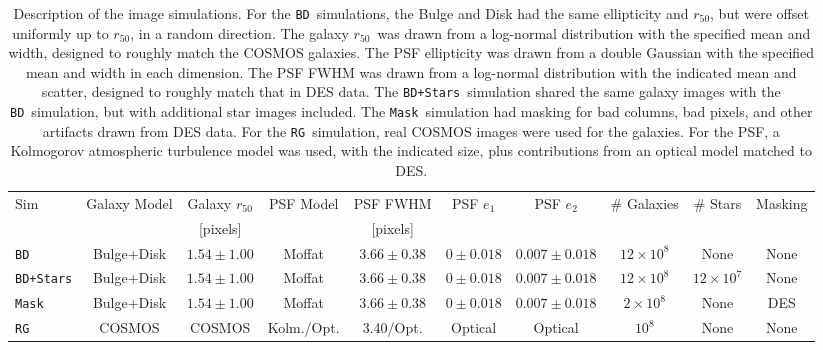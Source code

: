 \documentclass[usegraphicx,usenatbib]{mn2e}
\newcommand{\hlr}{$r_{50}$}
\newcommand{\nsimNgal}{$10^8$}
\newcommand{\nsimNgalTwo}{$2 \times 10^8$}
\newcommand{\nsimNgalBD}{$12 \times 10^8$}
\newcommand{\nsimNStar}{$12 \times 10^7$}
\newcommand{\psfeonedist}{$0 \pm 0.018$}
\newcommand{\psfetwodist}{$0.007 \pm 0.018$}
\newcommand{\psfrdist}{$3.66 \pm 0.38$}
\newcommand{\galrdist}{$1.54 \pm 1.00$}
\newcommand{\cosmosname}{COSMOS}
\newcommand{\bdsim}{\texttt{BD}}
\newcommand{\bdstar}{\texttt{BD+Stars}}
\newcommand{\bdmask}{\texttt{Mask}}
\newcommand{\rgsim}{\texttt{RG}}
\begin{document}
\begin{table}
    \centering
    \caption{Description of the image simulations.  For the \bdsim\ simulations,
        the Bulge and Disk had the same ellipticity and \hlr, but were offset
        uniformly up to \hlr, in a random direction.  The galaxy \hlr\ was drawn
        from a log-normal distribution with the specified mean and width, designed
        to roughly match the COSMOS galaxies.  The PSF ellipticity was
        drawn from a double Gaussian with the specified mean and width in each
        dimension.  The PSF FWHM was drawn from a log-normal distribution with
        the indicated mean and scatter, designed to roughly match
        that in DES data.  The \bdstar\ simulation shared the
        same galaxy images with the \bdsim\ simulation, but with additional star
        images included.  The \bdmask\ simulation had masking for bad columns,
        bad pixels, and other artifacts drawn from DES data. For the \rgsim\
        simulation, real COSMOS images were used for the galaxies. For
        the PSF, a  Kolmogorov atmospheric turbulence model was used,
        with the indicated size,
        plus contributions from an optical model matched to DES. \label{tab:sims}}
    \begin{tabular}{ | l | c | c | c | c | c | c | c | c | c |}
        Sim          & Galaxy Model & Galaxy \hlr & PSF Model       & PSF FWHM        & PSF $e_1$    & PSF $e_2$   & \# Galaxies    & \# Stars   & Masking   \\
                     &              & [pixels]    &                 & [pixels]        &              &             &                &            &  \\
        \hline
        \bdsim       & Bulge+Disk   & \galrdist   & Moffat          & \psfrdist       & \psfeonedist &\psfetwodist &  \nsimNgalBD & None       & None      \\
        \bdstar      & Bulge+Disk   & \galrdist   & Moffat          & \psfrdist       & \psfeonedist &\psfetwodist &  \nsimNgalBD & \nsimNStar & None      \\
        \bdmask      & Bulge+Disk   & \galrdist   & Moffat          & \psfrdist       & \psfeonedist &\psfetwodist &  \nsimNgalTwo  & None       & DES      \\
        \rgsim       & \cosmosname  & \cosmosname & Kolm./Opt.      & 3.40/Opt.       & Optical      & Optical     &  \nsimNgal     & None       & None      \\
    \end{tabular}
\end{table}
\end{document}
